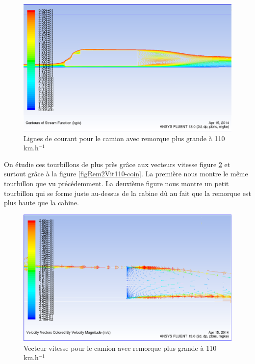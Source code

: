 \begin{figure}[!h]
\centering
\includegraphics[scale=0.4]{resultsCx/remorque2_110_stream.png}
\caption{Lignes de courant pour le camion avec remorque plus grande à 110 km.h$^{-1}$}
\label{figRem2Stream110}
\end{figure}
\clearpage

On étudie ces tourbillons de plus près grâce aux vecteurs vitesse figure \ref{figRem2Vit110} et surtout grâce à la figure \ref{figRem2Vit110-coin}. La première nous montre le même tourbillon que vu précédemment. La deuxième figure nous montre un petit tourbillon qui se forme juste au-dessus de la cabine dû au fait que la remorque est plus haute que la cabine.\\
\begin{figure}[!h]
\centering
\includegraphics[scale=0.4]{resultsCx/Remorque2-110_VelocityVectors.png}
\caption{Vecteur vitesse pour le camion avec remorque plus grande à 110 km.h$^{-1}$}
\label{figRem2Vit110}
\end{figure}

